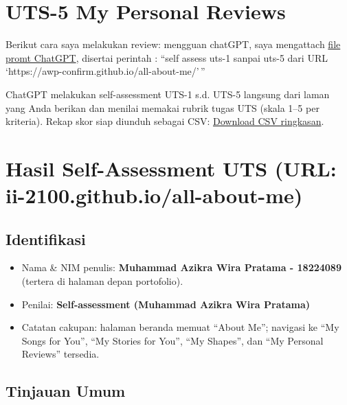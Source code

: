 \documentclass[
  letterpaper,
  DIV=11,
  numbers=noendperiod]{scrreprt}
\providecommand{\tightlist}{%
  \setlength{\itemsep}{0pt}\setlength{\parskip}{0pt}}
\begin{document}

\chapter{UTS-5 My Personal Reviews}\label{uts-5-my-personal-reviews}

Berikut cara saya melakukan review: mengguan chatGPT, saya mengattach
\href{skor_uts.pdf}{file promt ChatGPT}, disertai perintah : ``self
assess uts-1 sanpai uts-5 dari URL
`https://awp-confirm.github.io/all-about-me/'\,''

ChatGPT melakukan self-assessment UTS-1 s.d. UTS-5 langsung dari laman
yang Anda berikan dan menilai memakai rubrik tugas UTS (skala 1--5 per
kriteria). Rekap skor siap diunduh sebagai CSV:
\href{Self-Assessment_UTS-1_s_d__UTS-5__dibuat_otomatis_.csv}{Download
CSV ringkasan}.


\chapter{Hasil Self-Assessment UTS (URL:
ii-2100.github.io/all-about-me)}\label{hasil-self-assessment-uts-url-ii-2100.github.ioall-about-me}

\section{Identifikasi}\label{identifikasi}

\begin{itemize}
\tightlist
\item
  Nama \& NIM penulis: \textbf{Muhammad Azikra Wira Pratama - 18224089}
  (tertera di halaman depan portofolio).
\item
  Penilai: \textbf{Self-assessment (Muhammad Azikra Wira Pratama)}
\item
  Catatan cakupan: halaman beranda memuat ``About Me''; navigasi ke ``My
  Songs for You'', ``My Stories for You'', ``My Shapes'', dan ``My
  Personal Reviews'' tersedia.
\end{itemize}

\section{Tinjauan Umum}\label{tinjauan-umum}
\end{document}
